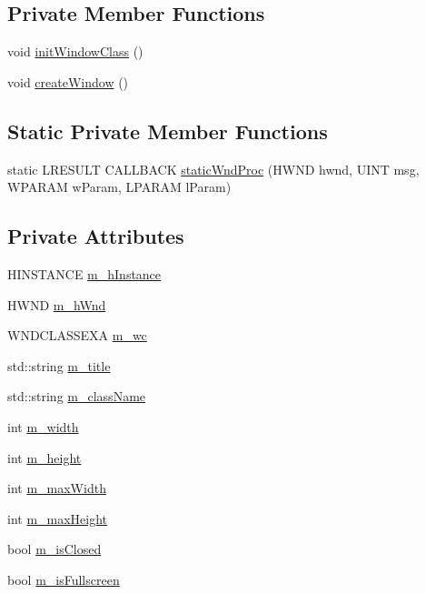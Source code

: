 \subsection*{Private Member Functions}
\begin{DoxyCompactItemize}
\item 
void \hyperlink{class_piko_1_1_window_base_a76abd6ba4b10fcaa660374be5a2e5e72}{init\-Window\-Class} ()
\item 
void \hyperlink{class_piko_1_1_window_base_a1499a79647a1d375c3d471b29e1c9aeb}{create\-Window} ()
\end{DoxyCompactItemize}
\subsection*{Static Private Member Functions}
\begin{DoxyCompactItemize}
\item 
static L\-R\-E\-S\-U\-L\-T C\-A\-L\-L\-B\-A\-C\-K \hyperlink{class_piko_1_1_window_base_a7dd15d87a3b3da34271d4973faff0926}{static\-Wnd\-Proc} (H\-W\-N\-D hwnd, U\-I\-N\-T msg, W\-P\-A\-R\-A\-M w\-Param, L\-P\-A\-R\-A\-M l\-Param)
\end{DoxyCompactItemize}
\subsection*{Private Attributes}
\begin{DoxyCompactItemize}
\item 
H\-I\-N\-S\-T\-A\-N\-C\-E \hyperlink{class_piko_1_1_window_base_a84ca71a9b2cfe6ff0a7530a127fad31c}{m\-\_\-h\-Instance}
\item 
H\-W\-N\-D \hyperlink{class_piko_1_1_window_base_acc26556bb11c8c47a0499aad685bc69e}{m\-\_\-h\-Wnd}
\item 
W\-N\-D\-C\-L\-A\-S\-S\-E\-X\-A \hyperlink{class_piko_1_1_window_base_aa307fb2f2593554bff1338beda280d91}{m\-\_\-wc}
\item 
std\-::string \hyperlink{class_piko_1_1_window_base_a7ceb6bf3578cee3fea335d2fef70d4b2}{m\-\_\-title}
\item 
std\-::string \hyperlink{class_piko_1_1_window_base_ad6491bf8d178a85c5d57c9d2ef5ec706}{m\-\_\-class\-Name}
\item 
int \hyperlink{class_piko_1_1_window_base_aaa2d391163ae4db0a2bb7ff3cb241475}{m\-\_\-width}
\item 
int \hyperlink{class_piko_1_1_window_base_a66935c150f9a052b2f9fd5ec5e9116a2}{m\-\_\-height}
\item 
int \hyperlink{class_piko_1_1_window_base_a98906296f0425ce5dbb4e1a87d3e47b0}{m\-\_\-max\-Width}
\item 
int \hyperlink{class_piko_1_1_window_base_ad900258cbbba286731019361cc68c40a}{m\-\_\-max\-Height}
\item 
bool \hyperlink{class_piko_1_1_window_base_a0739592738b6a4e46206d3a2bf1cf892}{m\-\_\-is\-Closed}
\item 
bool \hyperlink{class_piko_1_1_window_base_aa0fcf89b789f911a37d526cd3d45a05b}{m\-\_\-is\-Fullscreen}
\end{DoxyCompactItemize}
